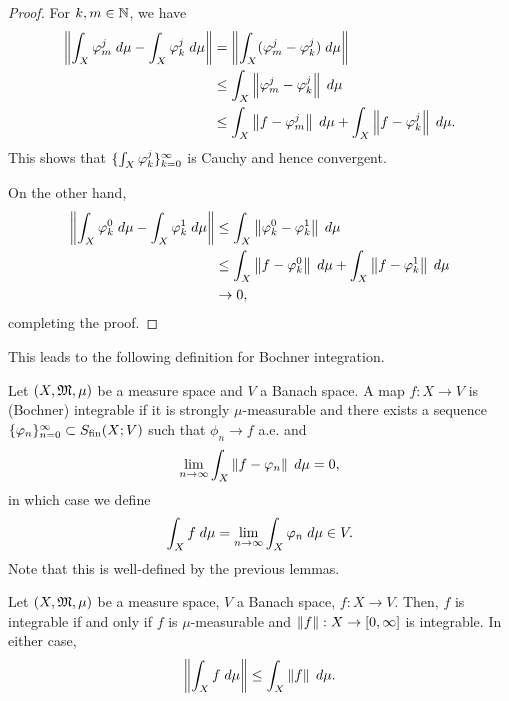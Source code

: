 \documentclass[a4paper]{article}
\begin{document}
\begin{proof}
For $k, m \in \mathbb{N}$, we have 
\[
\begin{aligned}
  \left\lVert \int_X \varphi_m^j \; d\mu - \int_X \varphi_k^j \; d \mu\right\rVert 
  &= \left\lVert \int_X (\varphi_m^j - \varphi_k^j) \; d \mu\right\rVert \\
  &\leq \int_X \left\lVert \varphi_m^j - \varphi_k^j\right\rVert \; d \mu \\
  &\leq \int_X \left\lVert f - \varphi_m^j\right\rVert \; d \mu
  + \int_X \left\lVert f - \varphi_k^j\right\rVert \; d \mu.
\end{aligned}
\]
This shows that $\{ \int_X \varphi_k^j \}_{k=0}^\infty$ is Cauchy
and hence convergent. 

On the other hand, 
\[
\begin{aligned}
\left\lVert \int_X \varphi_k^0 \; d \mu - \int_X \varphi_k^1 \; d \mu\right\rVert
&\leq \int_X \left\lVert \varphi_k^0 - \varphi_k^1\right\rVert \; d \mu \\
&\leq \int_X \left\lVert f - \varphi_k^0\right\rVert \; d \mu
+ \int_X \left\lVert f - \varphi_k^1\right\rVert \; d \mu \\
&\to 0,
\end{aligned}
\]
completing the proof.
\end{proof}

This leads to the following definition for Bochner integration.

\begin{defi}
Let $(X, \mathfrak{M}, \mu)$ be a measure space and $V$ a Banach space. 
A map $f : X \to V$ is (Bochner) integrable if 
it is strongly $\mu$-measurable and there exists a sequence
$\{ \varphi_n \}_{n=0}^\infty \subset S_{\text{fin}}(X; V)$ such that $\phi_n \to f$
a.e. and 
\[
\lim_{n \to \infty} \int_X \left\lVert f - \varphi_n\right\rVert \; d \mu = 0,
\] 
in which case we define 
\[
\int_X f \; d \mu = \lim_{n \to \infty} \int_X \varphi_n \; d \mu \in V.
\]
Note that this is well-defined by the previous lemmas.
\end{defi}

\begin{thm}
Let $(X, \mathfrak{M}, \mu)$ be a measure space, $V$ a Banach space, 
$f : X \to V$. Then, 
$f$ is integrable if and only if $f$ is $\mu$-measurable 
and $\left\lVert f\right\rVert : X \to [0, \infty]$ is integrable.
In either case, 
\[
\left\lVert \int_X f \; d \mu\right\rVert \leq \int_X \left\lVert f\right\rVert \; d \mu.
\]
\end{thm}
\end{document}
